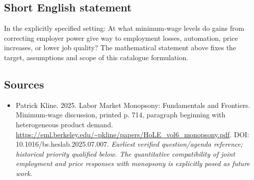\documentclass[11pt]{article}
\begin{document}
\subsection{Short English statement}
In the explicitly specified setting: At what minimum-wage levels do gains from correcting employer power give way to employment losses, automation, price increases, or lower job quality? The mathematical statement above fixes the target, assumptions and scope of this catalogue formulation.

\subsection{Sources}
\begin{itemize}\raggedright
\item[\textnormal{[S1]}]\hypertarget{source:30007633:1}{} Patrick Kline. 2025. Labor Market Monopsony: Fundamentals and Frontiers. Minimum-wage discussion, printed p. 714, paragraph beginning with heterogeneous product demand.
\url{https://eml.berkeley.edu/~pkline/papers/HoLE_vol6_monopsony.pdf}.
DOI: 10.1016/bs.heslab.2025.07.007.
{\small\textit{Earliest verified question/agenda reference; historical priority qualified below. The quantitative compatibility of joint employment and price responses with monopsony is explicitly posed as future work.}}
\end{itemize}
\end{document}
